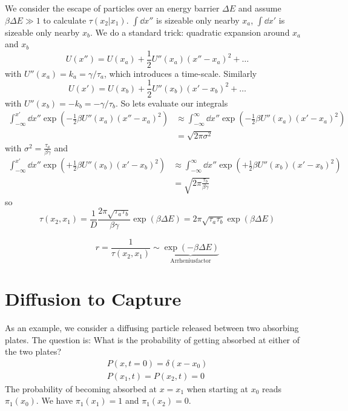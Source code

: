 \documentclass{notebook}
\begin{document}
We consider the escape of particles over an energy barrier $\Delta E$ and assume $\beta \Delta E \gg 1$ to calculate $\tau(x_2|x_1)$. $\int \dd{x''}$ is sizeable only nearby $x_a$, $\int \dd{x'}$ is sizeable only nearby $x_b$. We do a standard trick: quadratic expansion around $x_a$ and $x_b$
%
\begin{equation}
U(x'') = U(x_a) + \frac{1}{2} U''(x_a) (x''-x_a)^2 + \dots
\end{equation}
%
with $U''(x_a) = k_a = \gamma/\tau_a$, which introduces a time-scale. Similarly
%
\begin{equation}
U(x') = U(x_b) + \frac{1}{2} U''(x_b) (x'-x_b)^2 + \dots
\end{equation}
%
with $U''(x_b) = -k_b = -\gamma/\tau_b$. So lets evaluate our integrals
%
\begin{align*}
	\int_{-\infty}^{x'} \dd{x''} \exp(-  \frac{1}{2} \beta U''(x_a) (x''-x_a)^2)
	&\approx \int_{-\infty}^{\infty} \dd{x''} \exp(-  \frac{1}{2} \beta U''(x_a) (x'-x_a)^2) \\ 
	&= \sqrt{2 \pi \sigma^2}
\end{align*}
%
with $\sigma^2 = \frac{\tau_a}{\beta \gamma}$ and
%
\begin{align*}
	\int_{-\infty}^{x'} \dd{x''} \exp(+\frac{1}{2} \beta U''(x_b) (x'-x_b)^2)
	&\approx \int_{-\infty}^{\infty} \dd{x''} \exp(+\frac{1}{2} \beta U''(x_b) (x'-x_b)^2) \\ &= \sqrt{2 \pi \frac{\tau_b}{\beta \gamma}}
\end{align*}
%
so
%
\begin{equation}
\tau(x_2,x_1) = \frac{1}{D} \frac{2 \pi \sqrt{\tau_a \tau_b}}{\beta \gamma} \exp(\beta \Delta E) = 2 \pi \sqrt{\tau_a \tau_b} \exp(\beta \Delta E)
\end{equation}
%
\begin{theorem}
	\begin{equation}
	r = \frac{1}{\tau(x_2,x_1)} \sim \underbrace{\exp(-\beta \Delta E)}_{\mathrm{Arrhenius factor}}
	\end{equation}
\end{theorem}
%

\section{Diffusion to Capture}

As an example, we consider a diffusing particle released between two absorbing plates. The question is: What is the probability of getting absorbed at either of the two plates?
%
\begin{align*}
P(x, t=0) = \delta(x-x_0) \\
P(x_1, t) = P(x_2, t) = 0
\end{align*}
%
The probability of becoming absorbed at $x = x_1$ when starting at $x_0$ reads $\pi_1(x_0)$. We have $\pi_1(x_1) = 1$ and $\pi_1(x_2) = 0$.
\end{document}
